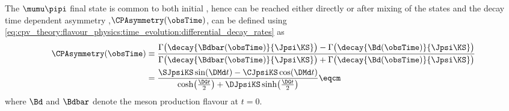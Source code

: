 The $\mumu\pipi$ final state is common to both initial \Bmesons, hence can be
reached either directly or after mixing of the \Bmeson states and the decay time
dependent \CP asymmetry ,$\CPAsymmetry(\obsTime)$, can be defined using
\cref{eq:cpv_theory:flavour_physics:time_evolution:differential_decay_rates} as
%
\begin{equation}\label{eq:cpv_theory:bd2jpsiks:cp_asymmetry}
  \begin{split}
    \CPAsymmetry(\obsTime) &\equiv 
      \frac{\Gamma\bigl(\decay{\Bdbar(\obsTime)}{\Jpsi\KS}\bigr) - \Gamma\bigl(\decay{\Bd(\obsTime)}{\Jpsi\KS}\bigr)}
           {\Gamma\bigl(\decay{\Bdbar(\obsTime)}{\Jpsi\KS}\bigr) + \Gamma\bigl(\decay{\Bd(\obsTime)}{\Jpsi\KS}\bigr)} \\
                 &= \frac{\SJpsiKS\sin(\DMd t) - \CJpsiKS\cos(\DMd t)}{\cosh\bigl(\frac{\DG t}{2}\bigr) + \DJpsiKS\sinh\bigl(\frac{\DG t}{2}\bigr)} \eqcm
  \end{split}
\end{equation}
%
where $\Bd$ and $\Bdbar$ denote the meson production flavour at $t=0$.

